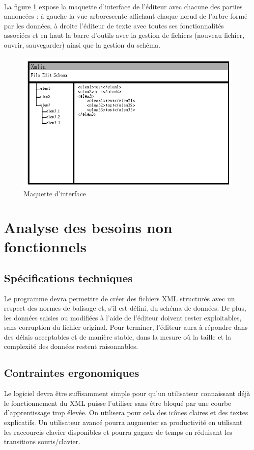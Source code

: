 \paragraph{}	
La figure \ref{maquette_interface} expose la maquette d'interface de l'éditeur avec chacune des parties annoncées : à gauche la vue arborescente affichant chaque nœud de l'arbre formé par les données, à droite l'éditeur de texte avec toutes ses fonctionnalités associées et en haut la barre d'outils avec la gestion de fichiers (nouveau fichier, ouvrir, sauvegarder) ainsi que la gestion du schéma.

\begin{figure}[h!]
\begin{minipage}[b]{\linewidth}
\centering \includegraphics[scale=0.5]{images/analyse-maquette.png}
\caption{Maquette d'interface}
\label{maquette_interface}
\end{minipage}
\end{figure}
	
\section{Analyse des besoins non fonctionnels}
\subsection{Spécifications techniques}
Le programme devra permettre de créer des fichiers XML structurés avec un respect des normes de balisage et, s'il est défini, du schéma de données. De plus, les données saisies ou modifiées à l'aide de l'éditeur doivent rester exploitables, sans corruption du fichier original. Pour terminer, l'éditeur aura à répondre dans des délais acceptables et de manière stable, dans la mesure où la taille et la complexité des données restent raisonnables.
		
\subsection{Contraintes ergonomiques}
Le logiciel devra être suffisamment simple pour qu'un utilisateur connaissant déjà le fonctionnement du XML puisse l'utiliser sans être bloqué par une courbe d'apprentissage trop élevée. On utilisera pour cela des icônes claires et des textes explicatifs. Un utilisateur avancé pourra augmenter sa productivité en utilisant les raccourcis clavier disponibles et pourra gagner de temps en réduisant les transitions souris/clavier.
